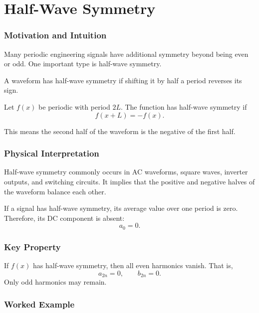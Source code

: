 \section{Half-Wave Symmetry}

\subsubsection*{Motivation and Intuition}

Many periodic engineering signals have additional symmetry beyond being even or odd. One important type is half-wave symmetry.

A waveform has half-wave symmetry if shifting it by half a period reverses its sign.

\begin{conceptbox}
Let $f(x)$ be periodic with period $2L$. The function has half-wave symmetry if
\[
f(x+L)=-f(x).
\]
\end{conceptbox}

This means the second half of the waveform is the negative of the first half.

\subsubsection*{Physical Interpretation}

Half-wave symmetry commonly occurs in AC waveforms, square waves, inverter outputs, and switching circuits. It implies that the positive and negative halves of the waveform balance each other.

\begin{noteBox}
If a signal has half-wave symmetry, its average value over one period is zero. Therefore, its DC component is absent:
\[
a_0=0.
\]
\end{noteBox}

\subsubsection*{Key Property}

\begin{conceptbox}
If $f(x)$ has half-wave symmetry, then all even harmonics vanish. That is,
\[
a_{2n}=0,\qquad b_{2n}=0.
\]
Only odd harmonics may remain.
\end{conceptbox}

\subsubsection*{Worked Example}

